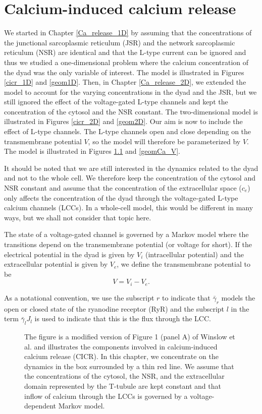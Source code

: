 
\chapter{Calcium-induced calcium release \label{cicr}}



We started in Chapter \ref{Ca_release_1D} by assuming that the concentrations of the junctional sarcoplasmic reticulum (JSR) and the network sarcoplasmic reticulum (NSR) are identical and that the L-type current can be ignored and thus we studied a one-dimensional problem where the calcium concentration of the dyad was the only variable of interest. The model is illustrated in Figures \ref{cicr_1D} and \ref{geom1D}. Then, in Chapter  \ref{Ca_release_2D}, we extended the model to account for the varying concentrations in the dyad and the JSR, but we still ignored the effect of the voltage-gated L-type channels and kept the concentration of the cytosol and the NSR constant. The two-dimensional model is illustrated in Figures \ref{cicr_2D} and \ref{geom2D}. Our aim is now to include the effect of L-type channels. The L-type channels open and close depending on the transmembrane potential $V$, so the model will therefore be parameterized by $V$. The model is illustrated in Figures \ref{cicr_2D_V} and \ref{geomCa_V}.

It should be noted that we are still interested in the dynamics related to the dyad and not to the whole cell. We therefore keep the concentration of the cytosol and NSR constant and assume that the concentration of the extracellular space ($c_e$) only affects the concentration of the dyad through the voltage-gated L-type calcium channels (LCCs). In a whole-cell model, this would be different in many ways, but we shall not consider that topic here.

The state of a voltage-gated channel is governed by a Markov model where the transitions depend on the transmembrane potential (or voltage for short). If the electrical potential in the dyad is given by $V_{i}$
(intracellular potential) and the extracellular potential is given by $V_{e}%
$, we define the transmembrane potential to be%
\[
V=V_{i}-V_{e}.
\]

As a notational convention, we use the subscript $r$ to indicate that $\bar
{\gamma}_{r}$ models the open or closed state of the ryanodine receptor (RyR)
and the subscript $l$ in the term $\bar{\gamma}_{l}J_{l}$ is used to indicate 
that this is the flux through the LCC.

\begin{figure}
\centering{}
\caption{The figure is a modified version of Figure 1 (panel A) of Winslow et 
al. \cite{winslow2006} and illustrates the components involved in calcium-induced calcium release (CICR). In this chapter, we concentrate on the dynamics in the box surrounded by a thin red line. We assume that the concentrations of the cytosol, the NSR, and the extracellular domain 
represented by the T-tubule are kept constant and that inflow of calcium through the LCCs is governed by a voltage-dependent Markov model.
 \label{cicr_2D_V}}
\end{figure}


